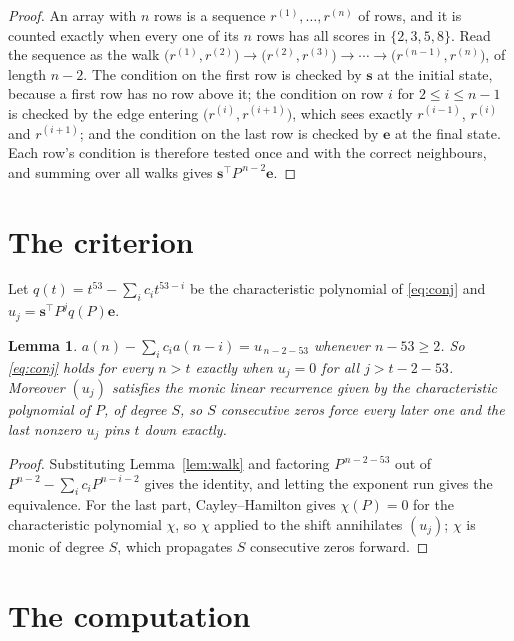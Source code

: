 \documentclass[11pt,a4paper]{article}
\theoremstyle{plain}
\newtheorem{lemma}[theorem]{Lemma}
\theoremstyle{definition}
\begin{document}
\begin{proof}
An array with $n$ rows is a sequence $r^{(1)},\dots,r^{(n)}$ of rows, and it is counted
exactly when every one of its $n$ rows has all scores in $\{2,3,5,8\}$. Read the sequence as the
walk $\bigl(r^{(1)},r^{(2)}\bigr)\to\bigl(r^{(2)},r^{(3)}\bigr)\to\cdots\to
\bigl(r^{(n-1)},r^{(n)}\bigr)$, of length $n-2$. The condition on the first row is
checked by $\mathbf{s}$ at the initial state, because a first row has no row above it; the
condition on row $i$ for $2\le i\le n-1$ is checked by the edge entering
$\bigl(r^{(i)},r^{(i+1)}\bigr)$, which sees exactly $r^{(i-1)}$, $r^{(i)}$ and
$r^{(i+1)}$; and the condition on the last row is checked by $\mathbf{e}$ at the final
state. Each row's condition is therefore tested once and with the correct neighbours, and
summing over all walks gives $\mathbf{s}^{\!\top}P^{\,n-2}\mathbf{e}$.
\end{proof}

\section{The criterion}

Let $q(t)=t^{53}-\sum_i c_i t^{53-i}$ be the characteristic polynomial of
\eqref{eq:conj} and $u_j=\mathbf{s}^{\!\top}P^{j}q(P)\mathbf{e}$.

\begin{lemma}\label{lem:crit}
$a(n)-\sum_i c_i a(n-i)=u_{\,n-2-53}$ whenever $n-53\ge2$. So \eqref{eq:conj}
holds for every $n>t$ exactly when $u_j=0$ for all $j>t-2-53$. Moreover $(u_j)$
satisfies the monic linear recurrence given by the characteristic polynomial of $P$, of
degree $S$, so $S$ consecutive zeros force every later one and the last nonzero $u_j$ pins
$t$ down exactly.
\end{lemma}

\begin{proof}
Substituting Lemma~\ref{lem:walk} and factoring $P^{\,n-2-53}$ out of
$P^{n-2}-\sum_i c_i P^{n-i-2}$ gives the identity, and letting the exponent run gives the
equivalence. For the last part, Cayley--Hamilton gives $\chi(P)=0$ for the characteristic
polynomial $\chi$, so $\chi$ applied to the shift annihilates $(u_j)$; $\chi$ is monic of
degree $S$, which propagates $S$ consecutive zeros forward.
\end{proof}

\section{The computation}
\end{document}
